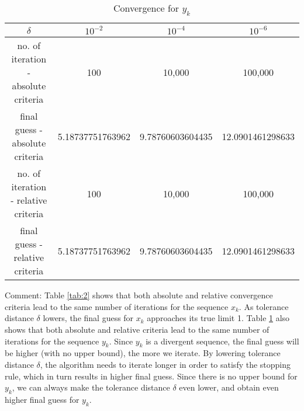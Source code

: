 \documentclass[11pt]{article}
\newcommand{\1}{\mathbbm{1}}
\begin{document}
	\begin{table}[h]
	\centering
	\begin{tabular}{|c | c | c | c |}
		\hline
		\hline
		$\delta	$							&$10^{-2}$ 			&$10^{-4}$ 			&$10^{-6}$          \\
		\hline
		no. of iteration - absolute criteria&100					&10,000				&100,000 \\
		final guess - absolute criteria		&5.18737751763962	&9.78760603604435	&12.0901461298633\\
		no. of iteration - relative criteria&100					&10,000				&100,000 \\
		final guess - relative criteria		&5.18737751763962	&9.78760603604435	&12.0901461298633\\
		\hline
		\hline
	\end{tabular} 
	\caption{Convergence for $y_k$}
	\label{tab:3}
\end{table}

Comment: Table \ref{tab:2} shows that both absolute and relative convergence criteria lead to the same number of iterations for the sequence $x_k$. As tolerance distance $\delta$ lowers, the final guess for $x_k$ approaches its true limit 1. Table \ref{tab:3} also shows that both absolute and relative criteria lead to the same number of iterations for the sequence $y_k$. Since $y_k$ is a divergent sequence, the final guess will be higher (with no upper bound), the more we iterate. By lowering tolerance distance $\delta$, the algorithm needs to iterate longer in order to satisfy the stopping rule, which in turn results in higher final guess. Since there is no upper bound for $y_k$, we can always make the tolerance distance $\delta$ even lower, and obtain even higher final guess for $y_k$.
\end{document}
